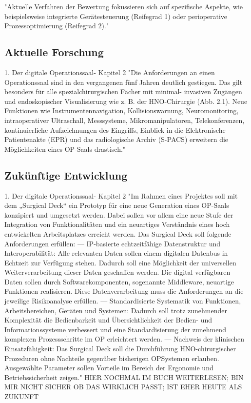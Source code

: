 	"Aktuelle Verfahren der Bewertung fokussieren sich auf spezifische Aspekte, wie
	beispielsweise integrierte Gerätesteuerung (Reifegrad 1) oder perioperative Prozessoptimierung
	(Reifegrad 2)."
\subsection{Aktuelle Forschung}

1. Der digitale Operationssaal- Kapitel 2
"Die Anforderungen an einen Operationssaal sind in den vergangenen fünf Jahren
deutlich gestiegen. Das gilt besonders für alle spezialchirurgischen Fächer mit minimal-
invasiven Zugängen und endoskopischer Visualisierung wie z. B. der HNO-Chirurgie
(Abb. 2.1). Neue Funktionen wie Instrumentennavigation, Kollisionswarnung,
Neuromonitoring, intraoperativer Ultraschall, Messsysteme, Mikromanipulatoren,
Telekonferenzen, kontinuierliche Aufzeichnungen des Eingriffs, Einblick in die Elektronische
Patientenakte (EPR) und das radiologische Archiv (S-PACS) erweitern die
Möglichkeiten eines OP-Saals drastisch."

	
\subsection{Zukünftige Entwicklung}
1. Der digitale Operationssaal- Kapitel 2
	"Im Rahmen eines Projektes soll mit dem „Surgical Deck“ ein Prototyp für eine neue
	Generation eines OP-Saals konzipiert und umgesetzt werden. Dabei sollen vor allem
	eine neue Stufe der Integration von Funktionalitäten und ein neuartiges Verständnis
	eines hoch entwickelten Arbeitsplatzes erreicht werden. Das Surgical Deck soll folgende
	Anforderungen erfüllen:
	–– IP-basierte echtzeitfähige Datenstruktur und Interoperabilität: Alle relevanten
	Daten sollen einem digitalen Datenbus in Echtzeit zur Verfügung stehen. Dadurch
	soll eine Möglichkeit der universellen Weiterverarbeitung dieser Daten geschaffen
	werden. Die digital verfügbaren Daten sollen durch Softwarekomponenten,
	sogenannte Middleware, neuartige Funktionen realisieren. Diese Datenverarbeitung
	muss die Anforderungen an die jeweilige Risikoanalyse erfüllen.
	–– Standardisierte Systematik von Funktionen, Arbeitsbereichen, Geräten und Systemen:
	Dadurch soll trotz zunehmender Komplexität die Bedienbarkeit und Übersichtlichkeit
	der Bedien- und Informationssysteme verbessert und eine Standardisierung
	der zunehmend komplexen Prozessschritte im OP erleichtert werden.
	–– Nachweis der klinischen Einsatzfähigkeit: Das Surgical Deck soll die Durchführung
	HNO-chirurgischer Prozeduren ohne Nachteile gegenüber bisherigen OPSystemen
	erlauben. Ausgewählte Parameter sollen Vorteile im Bereich der Ergonomie
	und Betriebssicherheit zeigen."
	HIER NOCHMAL IM BUCH WEITERLESEN; BIN MIR NICHT SICHER OB DAS WIRKLICH PASST; IST EHER HEUTE ALS ZUKUNFT
	
	
	



